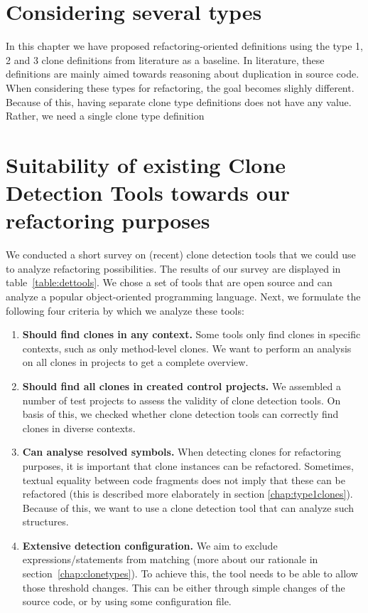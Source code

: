 \section{Considering several types}
In this chapter we have proposed refactoring-oriented definitions using the type 1, 2 and 3 clone definitions from literature as a baseline. In literature, these definitions are mainly aimed towards reasoning about duplication in source code. When considering these types for refactoring, the goal becomes slighly different. Because of this, having separate clone type definitions does not have any value. Rather, we need a single clone type definition

\section{Suitability of existing Clone Detection Tools towards our refactoring purposes}
\label{ch:tool-overview}
We conducted a short survey on (recent) clone detection tools that we could use to analyze refactoring possibilities. The results of our survey are displayed in table~\ref{table:dettools}. We chose a set of tools that are open source and can analyze a popular object-oriented programming language. Next, we formulate the following four criteria by which we analyze these tools:
\begin{enumerate}
    \item \textbf{Should find clones in any context.} Some tools only find clones in specific contexts, such as only method-level clones. We want to perform an analysis on all clones in projects to get a complete overview.
\item \textbf{Should find all clones in created control projects.} We assembled a number of test projects to assess the validity of clone detection tools. On basis of this, we checked whether clone detection tools can correctly find clones in diverse contexts.
\item \textbf{Can analyse resolved symbols.} When detecting clones for refactoring purposes, it is important that clone instances can be refactored. Sometimes, textual equality between code fragments does not imply that these can be refactored (this is described more elaborately in section \ref{chap:type1clones}). Because of this, we want to use a clone detection tool that can analyze such structures.
\item \textbf{Extensive detection configuration.} We aim to exclude expressions/statements from matching (more about our rationale in section~\ref{chap:clonetypes}). To achieve this, the tool needs to be able to allow those threshold changes. This can be either through simple changes of the source code, or by using some configuration file.
\end{enumerate}

